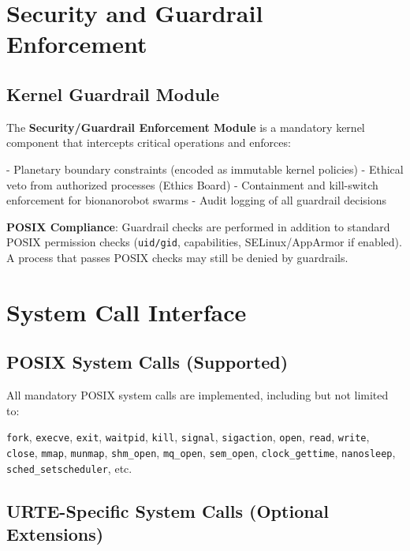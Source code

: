 \documentclass[11pt,a4paper]{report}
\begin{document}
\chapter{Security and Guardrail Enforcement}

\section{Kernel Guardrail Module}

The \textbf{Security/Guardrail Enforcement Module} is a mandatory kernel component that intercepts critical operations and enforces:

- Planetary boundary constraints (encoded as immutable kernel policies)
- Ethical veto from authorized processes (Ethics Board)
- Containment and kill-switch enforcement for bionanorobot swarms
- Audit logging of all guardrail decisions

\textbf{POSIX Compliance}: Guardrail checks are performed in addition to standard POSIX permission checks (\texttt{uid/gid}, capabilities, SELinux/AppArmor if enabled). A process that passes POSIX checks may still be denied by guardrails.

\chapter{System Call Interface}

\section{POSIX System Calls (Supported)}

All mandatory POSIX system calls are implemented, including but not limited to:

\texttt{fork}, \texttt{execve}, \texttt{exit}, \texttt{waitpid}, \texttt{kill}, \texttt{signal}, \texttt{sigaction}, \texttt{open}, \texttt{read}, \texttt{write}, \texttt{close}, \texttt{mmap}, \texttt{munmap}, \texttt{shm\_open}, \texttt{mq\_open}, \texttt{sem\_open}, \texttt{clock\_gettime}, \texttt{nanosleep}, \texttt{sched\_setscheduler}, etc.

\section{URTE-Specific System Calls (Optional Extensions)}
\end{document}
